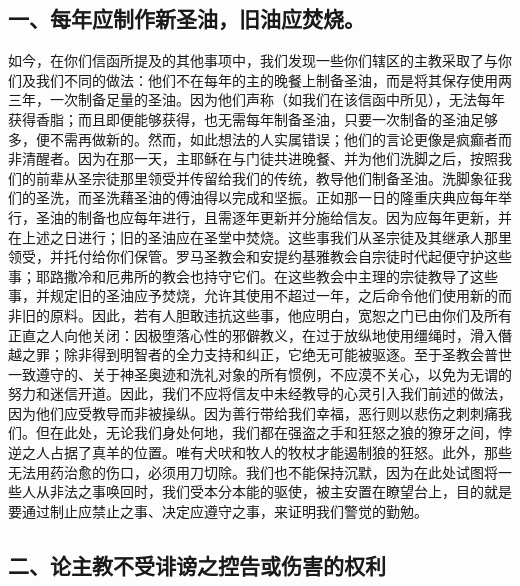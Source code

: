 
\subsection{一、每年应制作新圣油，旧油应焚烧。}

如今，在你们信函所提及的其他事项中，我们发现一些你们辖区的主教采取了与你们及我们不同的做法：他们不在每年的主的晚餐上制备圣油，而是将其保存使用两三年，一次制备足量的圣油。因为他们声称（如我们在该信函中所见），无法每年获得香脂；而且即便能够获得，也无需每年制备圣油，只要一次制备的圣油足够多，便不需再做新的。然而，如此想法的人实属错误；他们的言论更像是疯癫者而非清醒者。因为在那一天，主耶稣在与门徒共进晚餐、并为他们洗脚之后，按照我们的前辈从圣宗徒那里领受并传留给我们的传统，教导他们制备圣油。洗脚象征我们的圣洗，而圣洗藉圣油的傅油得以完成和坚振。正如那一日的隆重庆典应每年举行，圣油的制备也应每年进行，且需逐年更新并分施给信友。因为应每年更新，并在上述之日进行；旧的圣油应在圣堂中焚烧。这些事我们从圣宗徒及其继承人那里领受，并托付给你们保管。罗马圣教会和安提约基雅教会自宗徒时代起便守护这些事；耶路撒冷和厄弗所的教会也持守它们。在这些教会中主理的宗徒教导了这些事，并规定旧的圣油应予焚烧，允许其使用不超过一年，之后命令他们使用新的而非旧的原料。因此，若有人胆敢违抗这些事，他应明白，宽恕之门已由你们及所有正直之人向他关闭：因极堕落心性的邪僻教义，在过于放纵地使用缰绳时，滑入僭越之罪；除非得到明智者的全力支持和纠正，它绝无可能被驱逐。至于圣教会普世一致遵守的、关于神圣奥迹和洗礼对象的所有惯例，不应漠不关心，以免为无谓的努力和迷信开道。因此，我们不应将信友中未经教导的心灵引入我们前述的做法，因为他们应受教导而非被操纵。因为善行带给我们幸福，恶行则以悲伤之刺刺痛我们。但在此处，无论我们身处何地，我们都在强盗之手和狂怒之狼的獠牙之间，悖逆之人占据了真羊的位置。唯有犬吠和牧人的牧杖才能遏制狼的狂怒。此外，那些无法用药治愈的伤口，必须用刀切除。我们也不能保持沉默，因为在此处试图将一些人从非法之事唤回时，我们受本分本能的驱使，被主安置在瞭望台上，目的就是要通过制止应禁止之事、决定应遵守之事，来证明我们警觉的勤勉。\par


\subsection{二、论主教不受诽谤之控告或伤害的权利}

